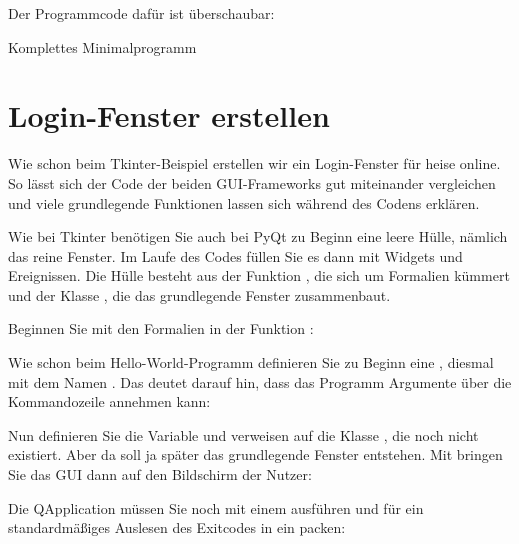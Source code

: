 Der Programmcode dafür ist überschaubar:

\medskip

\begin{code}
          
  \caption{Komplettes Minimalprogramm }
\end{code}  
    
 
\section{Login-Fenster erstellen}
 
Wie schon beim Tkinter-Beispiel erstellen wir ein Login-Fenster für heise online. So lässt sich der Code der beiden GUI-Frameworks gut miteinander vergleichen und viele grundlegende Funktionen lassen sich während des Codens erklären.
    
Wie bei Tkinter benötigen Sie auch bei PyQt zu Beginn eine leere Hülle, nämlich das reine Fenster. Im Laufe des Codes füllen Sie es dann mit Widgets und Ereignissen. Die Hülle besteht aus der Funktion , die sich um Formalien kümmert und der Klasse , die das grundlegende Fenster zusammenbaut.
    
Beginnen Sie mit den Formalien in der Funktion :
 
\medskip
    

\medskip

Wie schon beim Hello-World-Programm definieren Sie zu Beginn eine , diesmal mit dem Namen . Das  deutet darauf hin, dass das Programm Argumente über die Kommandozeile annehmen kann:

\medskip
    

\medskip

Nun definieren Sie die Variable  und verweisen auf die Klasse , die noch nicht existiert. Aber da soll ja später das grundlegende Fenster entstehen. Mit  bringen Sie das GUI dann auf den Bildschirm der Nutzer:

\medskip
    


\medskip

Die QApplication  müssen Sie noch mit einem  ausführen und für ein standardmäßiges Auslesen des Exitcodes in ein  packen:


